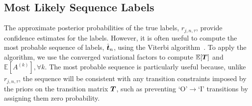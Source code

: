 \subsection{Most Likely Sequence Labels}

The approximate posterior probabilities of the true labels, $r_{j,n,\tau}$, provide confidence estimates for the labels. However, it is often useful to  compute 
the most probable sequence of labels, $\hat{\boldsymbol t}_n$, using the
Viterbi algorithm~\cite{viterbi1967error}. 
To apply the algorithm, we use the converged variational factors to compute 
$\mathbb{E}[\boldsymbol T]$ and $\mathbb{E}[A^{(k)}],\forall k$. %
The most probable sequence is particularly useful because, unlike $r_{j,n,\tau}$,
the sequence will be consistent with any transition 
constraints imposed by the priors on the transition matrix $\boldsymbol T$, 
such as preventing `O'$\rightarrow$`I' transitions by assigning them zero probability.


